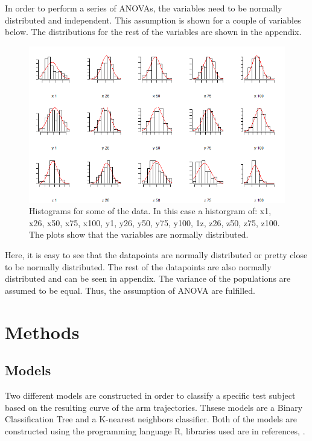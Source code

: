 \documentclass[11pt, fleqn, titlepage]{article}
\begin{document}
\noindent In order to perform a series of ANOVAs, the variables need to be normally distributed and independent. This assumption is shown for a couple of variables below. The distributions for the rest of the variables are shown in the appendix.

\begin{figure}[H]
	\centering
	\includegraphics[width=0.65\linewidth]{billeder/normalAF}
	\caption{Histograms for some of the data. In this case a historgram of: x1, x26, x50, x75, x100, y1, y26, y50, y75, y100, 1z, z26, z50, z75, z100. The plots show that the variables are normally distributed.}
	\label{fig:normalaf}
\end{figure}

\noindent Here, it is easy to see that the datapoints are normally distributed or pretty close to be normally distributed. The rest of the datapoints are also normally distributed and can be seen in appendix. The variance of the populations are assumed to be equal. Thus, the assumption of ANOVA are fulfilled.  

\section{Methods}

\subsection*{Models} \vspace*{-0.2cm}
Two different models are constructed in order to classify a specific test subject based on the resulting curve of the arm trajectories. Thsese models are a Binary Classification Tree and a K-nearest neighbors classifier. Both of the models are constructed using the programming language R, libraries used are in references, \cite{KNN, Tree}.
\vspace*{-0.2cm}
\end{document}
